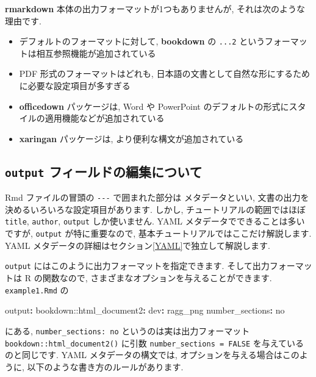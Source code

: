 \documentclass[
]{ltjsarticle}
\newenvironment{Shaded}{\begin{snugshade}}{\end{snugshade}}
\newcommand{\AttributeTok}[1]{\textcolor[rgb]{0.77,0.63,0.00}{#1}}
\newcommand{\CharTok}[1]{\textcolor[rgb]{0.31,0.60,0.02}{#1}}
\newcommand{\FunctionTok}[1]{\textcolor[rgb]{0.00,0.00,0.00}{#1}}
\newcommand{\KeywordTok}[1]{\textcolor[rgb]{0.13,0.29,0.53}{\textbf{#1}}}
\providecommand{\tightlist}{%
  \setlength{\itemsep}{0pt}\setlength{\parskip}{0pt}}
\begin{document}
\textbf{rmarkdown} 本体の出力フォーマットが1つもありませんが, それは次のような理由です.

\begin{itemize}
\tightlist
\item
  デフォルトのフォーマットに対して, \textbf{bookdown} の \texttt{...2} というフォーマットは相互参照機能が追加されている
\item
  PDF 形式のフォーマットはどれも, 日本語の文書として自然な形にするために必要な設定項目が多すぎる
\item
  \textbf{officedown} パッケージは, Word や PowerPoint のデフォルトの形式にスタイルの適用機能などが追加されている
\item
  \textbf{xaringan} パッケージは, より便利な構文が追加されている
\end{itemize}

\hypertarget{output-ux30d5ux30a3ux30fcux30ebux30c9ux306eux7de8ux96c6ux306bux3064ux3044ux3066}{%
\subsection{\texorpdfstring{\texttt{output} フィールドの編集について}{output フィールドの編集について}}\label{output-ux30d5ux30a3ux30fcux30ebux30c9ux306eux7de8ux96c6ux306bux3064ux3044ux3066}}

Rmd ファイルの冒頭の \texttt{-\/-\/-} で囲まれた部分は  メタデータといい, 文書の出力を決めるいろいろな設定項目があります. しかし, チュートリアルの範囲ではほぼ \texttt{title}, \texttt{author}, \texttt{output} しか使いません. YAML メタデータでできることは多いですが, \texttt{output} が特に重要なので, 基本チュートリアルではここだけ解説します. YAML メタデータの詳細はセクション\ref{YAML}で独立して解説します.

\texttt{output} にはこのように出力フォーマットを指定できます. そして出力フォーマットは R の関数なので, さまざまなオプションを与えることができます. \texttt{example1.Rmd} の

\begin{Shaded}
\begin{Highlighting}[]
\FunctionTok{output}\KeywordTok{:}
\AttributeTok{  bookdown:}\FunctionTok{:html\_document2}\KeywordTok{:}
\AttributeTok{    }\FunctionTok{dev}\KeywordTok{:}\AttributeTok{ ragg\_png}
\AttributeTok{    }\FunctionTok{number\_sections}\KeywordTok{:}\AttributeTok{ }\CharTok{no}
\end{Highlighting}
\end{Shaded}

にある, \texttt{number\_sections:\ no} というのは実は出力フォーマット \texttt{bookdown::html\_document2()} に引数 \texttt{number\_sections\ =\ FALSE} を与えているのと同じです. YAML メタデータの構文では, オプションを与える場合はこのように, 以下のような書き方のルールがあります.
\end{document}
